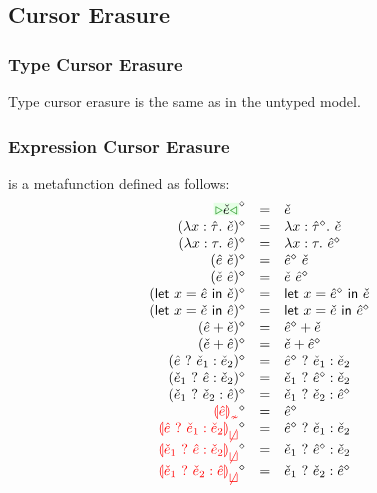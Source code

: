 \subsection{Cursor Erasure}
\subsubsection{Type Cursor Erasure}
Type cursor erasure is the same as in the untyped model.

\subsubsection{Expression Cursor Erasure}
\judgbox{\ensuremath{\cursorErase{\ZMV}}} is a metafunction defined as follows:
%
\[\begin{array}{rcl}
  \cursorErasesToRow{\ZCursor{\ECMV}}{\ECMV} \\
  \cursorErasesToRow{(\ZLamT{x}{\ZTMV}{\ECMV})}{\ECLam{x}{\cursorErase{\ZTMV}}{\ECMV}} \\
  \cursorErasesToRow{(\ZLamE{x}{\TMV}{\ZMV})}{\ECLam{x}{\TMV}{\cursorErase{\ZMV}}} \\
  \cursorErasesToRow{(\ZApL{\ZMV}{\ECMV})}{\ECAp{\cursorErase{\ZMV}}{\ECMV}} \\
  \cursorErasesToRow{(\ZApR{\ECMV}{\ZMV})}{\ECAp{\ECMV}{\cursorErase{\ZMV}}} \\
  \cursorErasesToRow{(\ZLetL{x}{\ZMV}{\ECMV})}{\ECLet{x}{\cursorErase{\ZMV}}{\ECMV}} \\
  \cursorErasesToRow{(\ZLetR{x}{\ECMV}{\ZMV})}{\ECLet{x}{\ECMV}{\cursorErase{\ZMV}}} \\
  \cursorErasesToRow{(\ZPlusL{\ZMV}{\ECMV})}{\ECPlus{\cursorErase{\ZMV}}{\ECMV}} \\
  \cursorErasesToRow{(\ZPlusR{\ECMV}{\ZMV})}{\ECPlus{\ECMV}{\cursorErase{\ZMV}}} \\
  \cursorErasesToRow{(\ZIfC{\ZMV}{\ECMV_1}{\ECMV_2})}{\ECIf{\cursorErase{\ZMV}}{\ECMV_1}{\ECMV_2}} \\
  \cursorErasesToRow{(\ZIfL{\ECMV_1}{\ZMV}{\ECMV_2})}{\ECIf{\ECMV_1}{\cursorErase{\ZMV}}{\ECMV_2}} \\
  \cursorErasesToRow{(\ZIfL{\ECMV_1}{\ECMV_2}{\ZMV})}{\ECIf{\ECMV_1}{\ECMV_2}{\cursorErase{\ZMV}}} \\
  \cursorErasesToRow{\ZInconType{\ZMV}}{\cursorErase{\ZMV}} \\
  \cursorErasesToRow{\ZInconBrC{\ZMV}{\ECMV_1}{\ECMV_2}}{\ECIf{\cursorErase{\ZMV}}{\ECMV_1}{\ECMV_2}} \\
  \cursorErasesToRow{\ZInconBrL{\ECMV_1}{\ZMV}{\ECMV_2}}{\ECIf{\ECMV_1}{\cursorErase{\ZMV}}{\ECMV_2}} \\
  \cursorErasesToRow{\ZInconBrR{\ECMV_1}{\ECMV_2}{\ZMV}}{\ECIf{\ECMV_1}{\ECMV_2}{\cursorErase{\ZMV}}} \\
\end{array}\]

